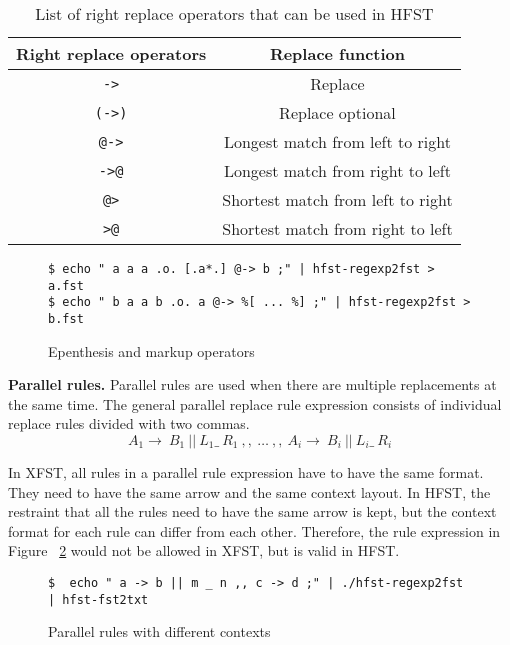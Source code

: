 \documentclass{llncs}
\begin{document}
\begin{table} [h!]
\centering
\begin{tabular}{| c | c |} 
\hline
Right replace operators & Replace function \\ \hline\hline
\verb!->!   & Replace \\ \hline
\verb!(->)! & Replace optional \\ \hline
\verb!@->!  & Longest match from left to right \\ \hline
\verb!->@!  & Longest match from right to left \\ \hline
\verb!@>!   & Shortest match from left to right \\ \hline
\verb!>@!   & Shortest match from right to left \\ \hline
\end{tabular}
\caption{List of right replace operators that can be used in HFST}
\label{tab:replace_operators}
\end{table}



\begin{figure} [h!]
 \begin{verbatim}
$ echo " a a a .o. [.a*.] @-> b ;" | hfst-regexp2fst > a.fst
$ echo " b a a b .o. a @-> %[ ... %] ;" | hfst-regexp2fst > b.fst
\end{verbatim}
\caption{Epenthesis and markup operators}
\label{fig:epenthesis_markup}
\end{figure}



\textbf{Parallel rules.} Parallel rules are used when there are multiple replacements at the same time. The general parallel replace rule expression consists of individual replace rules divided with two commas.
\begin{equation}
A_1 \rightarrow\ B_1\ ||\ L_1 \_\  R_1\ ,,\ \ldots\ ,,\ A_i \rightarrow\ B_i\ ||\ L_i \_\ R_i
\end{equation}

In XFST, all rules in a parallel rule expression have to have the same format. They need to have the same arrow and the same context layout. In HFST, the restraint that all the rules need to have the same arrow is kept, but the context format for each rule can differ from each other. Therefore, the rule expression in Figure ~\ref{fig:parallel_rules} would not be allowed in XFST, but is valid in HFST.
\begin{figure}
 \begin{verbatim}
$  echo " a -> b || m _ n ,, c -> d ;" | ./hfst-regexp2fst | hfst-fst2txt
\end{verbatim}
\caption{Parallel rules with different contexts}
\label{fig:parallel_rules}
\end{figure}
\end{document}
